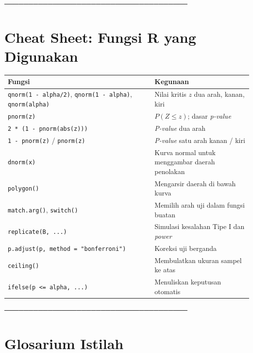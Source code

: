 \documentclass[
  indonesian,
  letterpaper,
]{book}
\newcounter{none} %
\begin{document}
──────────────────────────────────────

\section{Cheat Sheet: Fungsi R yang
Digunakan}\label{cheat-sheet-fungsi-r-yang-digunakan-1}

{\def\LTcaptype{none} %
\begin{longtable}[]{@{}
  >{\raggedright\arraybackslash}p{}
  >{\raggedright\arraybackslash}p{}@{}}
\toprule\noalign{}
\begin{minipage}[b]{\linewidth}\raggedright
Fungsi
\end{minipage} & \begin{minipage}[b]{\linewidth}\raggedright
Kegunaan
\end{minipage} \\
\midrule\noalign{}
\endhead
\bottomrule\noalign{}
\endlastfoot
\texttt{qnorm(1\ -\ alpha/2)}, \texttt{qnorm(1\ -\ alpha)},
\texttt{qnorm(alpha)} & Nilai kritis \(z\) dua arah, kanan, kiri \\
\texttt{pnorm(z)} & \(P(Z \le z)\); dasar \emph{p-value} \\
\texttt{2\ *\ (1\ -\ pnorm(abs(z)))} & \emph{P-value} dua arah \\
\texttt{1\ -\ pnorm(z)} / \texttt{pnorm(z)} & \emph{P-value} satu arah
kanan / kiri \\
\texttt{dnorm(x)} & Kurva normal untuk menggambar daerah penolakan \\
\texttt{polygon()} & Mengarsir daerah di bawah kurva \\
\texttt{match.arg()}, \texttt{switch()} & Memilih arah uji dalam fungsi
buatan \\
\texttt{replicate(B,\ ...)} & Simulasi kesalahan Tipe I dan
\emph{power} \\
\texttt{p.adjust(p,\ method\ =\ "bonferroni")} & Koreksi uji berganda \\
\texttt{ceiling()} & Membulatkan ukuran sampel ke atas \\
\texttt{ifelse(p\ \textless{}=\ alpha,\ ...)} & Menuliskan keputusan
otomatis \\
\end{longtable}
}

──────────────────────────────────────

\section{Glosarium Istilah}\label{glosarium-istilah-1}
\end{document}
